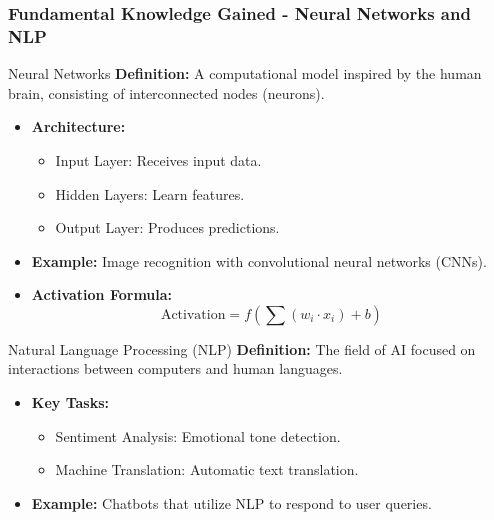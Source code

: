 \documentclass[aspectratio=169]{beamer}
\begin{document}
\begin{frame}[fragile]
    \frametitle{Fundamental Knowledge Gained - Neural Networks and NLP}
    \begin{block}{Neural Networks}
        \textbf{Definition:} A computational model inspired by the human brain, consisting of interconnected nodes (neurons).
        \begin{itemize}
            \item \textbf{Architecture:}
            \begin{itemize}
                \item Input Layer: Receives input data.
                \item Hidden Layers: Learn features.
                \item Output Layer: Produces predictions.
            \end{itemize}
            \item \textbf{Example:} Image recognition with convolutional neural networks (CNNs).
            \item \textbf{Activation Formula:}
            \begin{equation}
                \text{Activation} = f\left(\sum (w_i \cdot x_i) + b\right)
            \end{equation}
        \end{itemize}
    \end{block}

    \begin{block}{Natural Language Processing (NLP)}
        \textbf{Definition:} The field of AI focused on interactions between computers and human languages.
        \begin{itemize}
            \item \textbf{Key Tasks:}
            \begin{itemize}
                \item Sentiment Analysis: Emotional tone detection.
                \item Machine Translation: Automatic text translation.
            \end{itemize}
            \item \textbf{Example:} Chatbots that utilize NLP to respond to user queries.
        \end{itemize}
    \end{block}
\end{frame}
\end{document}
